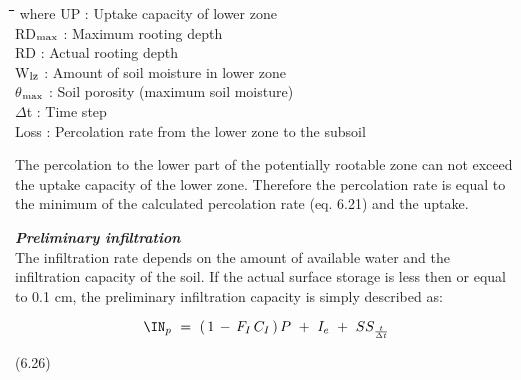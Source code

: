 \documentclass[11pt]{article}
\begin{document}
\nwln
\begin{tabbing}
\hspace{1.27cm}\=\hspace{1.27cm}\=\hspace{1.27cm}\=\hspace{1.27cm}\=%
\hspace{1.27cm}\=\hspace{1.27cm}\=\hspace{1.27cm}\=\hspace{1.27cm}\=%
\hspace{1.27cm}\=\hspace{1.27cm}\=\kill
where\> UP\> : Uptake capacity of lower zone\> \> \> \> \> \> \> \> [cm d$^{{\rm -1}}$]\\
\>RD$_{{\rm max}}$\> : Maximum rooting depth\> \> \> \> \> \> \> \> [cm]\\
\>RD\> : Actual rooting depth\> \> \> \> \> \> \> \> [cm]\\
\>W$_{{\rm lz}}$\> : Amount of soil moisture in lower zone\> \> \> \> \> \> \> \> [cm]\\
\>$\theta$$_{{\rm max}}$\> : Soil porosity (maximum soil moisture)\> \> \> \> \> \> \> \> [cm$^{{\rm 3}}$ cm$^{{\rm -3}}$]\\
\>$\Delta$t\> : Time step\> \> \> \> \> \> \> \> [d]\\
\>Loss\> : Percolation rate from the lower zone to the subsoil \> \> \> \> \> \> \> \> [cm d$^{{\rm -1}}$]
\end{tabbing}

 \bigskip
The percolation to the lower part of the potentially rootable zone can not exceed the
uptake capacity of the lower zone. Therefore the percolation rate is equal to the minimum
of the calculated percolation rate (eq. 6.21) and the uptake.

\bigskip
\bigskip
{\it {\bf Preliminary infiltration}\/}\\
The infiltration rate depends on the amount of available water and the infiltration capacity
of the soil. If the actual surface storage is less then or equal to 0.1 cm, the preliminary
infiltration capacity is simply described as:

\begin{displaymath}
\IN _{p~} =~ (\, 1\, -\, F _{I} \, C _{I} \, )\, P~+~ I _{e~} +~ SS _{\frac{t}{ \Delta t}} 
\end{displaymath}

 \bigskip
\strut\hfill (6.26)
\end{document}
